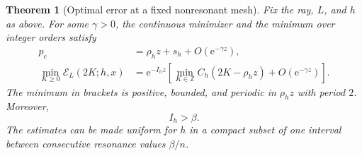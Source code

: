 \documentclass[11pt,a4paper]{article}
\numberwithin{equation}{section}
\newtheorem{theorem}{Theorem}[section]
\theoremstyle{definition}\newtheorem{definition}[theorem]{Definition}
\theoremstyle{remark}\newtheorem{remark}[theorem]{Remark}
\newcommand{\e}{\mathrm e}
\newcommand{\Z}{\mathbb Z}
\newcommand{\calE}{\mathcal E}
\begin{document}
\begin{theorem}[Optimal error at a fixed nonresonant mesh]
\label{thm:fixed}
Fix the ray, $L$, and $h$ as above. For some $\gamma>0$, the continuous
minimizer and the minimum over integer orders satisfy
\begin{align}
 p_c&=\rho_h z+s_h+O(\e^{-\gamma z}),\label{eq:fixed-p}\\
 \min_{K\ge0}\calE_L(2K;h,x)
 &=\e^{-I_hz}
 \left[\min_{K\in\Z}C_h(2K-\rho_hz)+O(\e^{-\gamma z})\right].
 \label{eq:fixed-min}
\end{align}
The minimum in brackets is positive, bounded, and periodic in
$\rho_hz$ with period $2$. Moreover,
\begin{equation}
 I_h>\beta.
 \label{eq:improved-action}
\end{equation}
The estimates can be made uniform for $h$ in a compact subset of one
interval between consecutive resonance values $\beta/n$.
\end{theorem}
\end{document}
